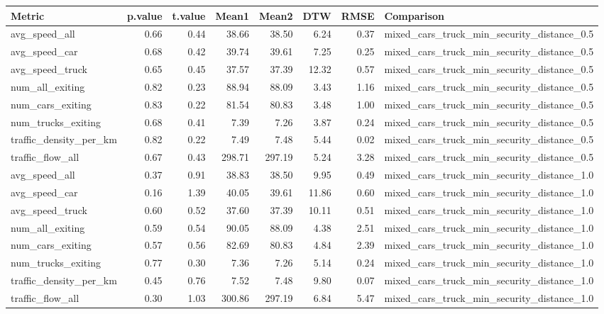 \begin{table}[ht]
\centering
\begin{tabular}{lrrrrrrl}
  \hline
Metric & p.value & t.value & Mean1 & Mean2 & DTW & RMSE & Comparison \\ 
  \hline
avg\_speed\_all & 0.66 & 0.44 & 38.66 & 38.50 & 6.24 & 0.37 & mixed\_cars\_truck\_min\_security\_distance\_0.5 \\ 
  avg\_speed\_car & 0.68 & 0.42 & 39.74 & 39.61 & 7.25 & 0.25 & mixed\_cars\_truck\_min\_security\_distance\_0.5 \\ 
  avg\_speed\_truck & 0.65 & 0.45 & 37.57 & 37.39 & 12.32 & 0.57 & mixed\_cars\_truck\_min\_security\_distance\_0.5 \\ 
  num\_all\_exiting & 0.82 & 0.23 & 88.94 & 88.09 & 3.43 & 1.16 & mixed\_cars\_truck\_min\_security\_distance\_0.5 \\ 
  num\_cars\_exiting & 0.83 & 0.22 & 81.54 & 80.83 & 3.48 & 1.00 & mixed\_cars\_truck\_min\_security\_distance\_0.5 \\ 
  num\_trucks\_exiting & 0.68 & 0.41 & 7.39 & 7.26 & 3.87 & 0.24 & mixed\_cars\_truck\_min\_security\_distance\_0.5 \\ 
  traffic\_density\_per\_km & 0.82 & 0.22 & 7.49 & 7.48 & 5.44 & 0.02 & mixed\_cars\_truck\_min\_security\_distance\_0.5 \\ 
  traffic\_flow\_all & 0.67 & 0.43 & 298.71 & 297.19 & 5.24 & 3.28 & mixed\_cars\_truck\_min\_security\_distance\_0.5 \\ 
  avg\_speed\_all & 0.37 & 0.91 & 38.83 & 38.50 & 9.95 & 0.49 & mixed\_cars\_truck\_min\_security\_distance\_1.0 \\ 
  avg\_speed\_car & 0.16 & 1.39 & 40.05 & 39.61 & 11.86 & 0.60 & mixed\_cars\_truck\_min\_security\_distance\_1.0 \\ 
  avg\_speed\_truck & 0.60 & 0.52 & 37.60 & 37.39 & 10.11 & 0.51 & mixed\_cars\_truck\_min\_security\_distance\_1.0 \\ 
  num\_all\_exiting & 0.59 & 0.54 & 90.05 & 88.09 & 4.38 & 2.51 & mixed\_cars\_truck\_min\_security\_distance\_1.0 \\ 
  num\_cars\_exiting & 0.57 & 0.56 & 82.69 & 80.83 & 4.84 & 2.39 & mixed\_cars\_truck\_min\_security\_distance\_1.0 \\ 
  num\_trucks\_exiting & 0.77 & 0.30 & 7.36 & 7.26 & 5.14 & 0.24 & mixed\_cars\_truck\_min\_security\_distance\_1.0 \\ 
  traffic\_density\_per\_km & 0.45 & 0.76 & 7.52 & 7.48 & 9.80 & 0.07 & mixed\_cars\_truck\_min\_security\_distance\_1.0 \\ 
  traffic\_flow\_all & 0.30 & 1.03 & 300.86 & 297.19 & 6.84 & 5.47 & mixed\_cars\_truck\_min\_security\_distance\_1.0 \\ 
   \hline
\end{tabular}
\end{table}
